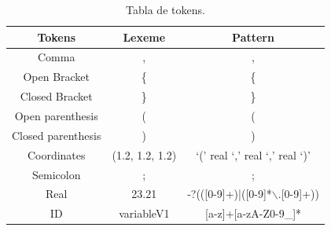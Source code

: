 \documentclass[12pt]{article}
\begin{document}
\begin{table}[h]
\centering
\begin{tabular}{| c | c | c |} \hline
\textbf{Tokens}   			& \textbf{Lexeme} 										&  \textbf{Pattern} 					\\\hline
Comma             			& ,       												& ,        								\\\hline
Open Bracket      			& \{       												& \{        							\\\hline
Closed Bracket    			& \}       												& \}       								\\\hline
Open parenthesis  			& (       												& (        								\\\hline
Closed parenthesis			& )       												& )        								\\\hline
Coordinates       			& (1.2, 1.2, 1.2)       								& `(' real `,' real `,' real `)'       	\\\hline
Semicolon       			& ;       												& ;		 								\\\hline
Real              			& 23.21       											& -?(([0-9]+)|([0-9]*$\backslash$.[0-9]+))  		\\\hline
ID             				& variableV1       										& [a-z]+[a-zA-Z0-9\_]* 					\\\hline

\end{tabular}
\caption{\label{tab:Tokens}Tabla de tokens.}
\end{table}
\end{document}
